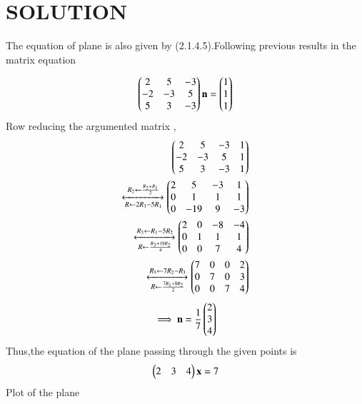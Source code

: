\documentclass[journal,12pt,twocolumn]{IEEEtran}
\begin{document}
\section{SOLUTION} 
The equation of plane is also given by (2.1.4.5).Following previous results in the matrix equation
\begin{enumerate}
\begin{align}
\begin{pmatrix}2 & 5 & -3\\-2 & -3 & 5\\5 & 3 & -3\end{pmatrix} \mathbf{n} = \begin{pmatrix}1\\1\\1\end{pmatrix}
\end{align}
Row reducing the argumented matrix ,
\begin{align}
\begin{pmatrix}2 & 5 & -3 & 1\\-2 & -3 & 5 & 1\\5 & 3 & -3 & 1\end{pmatrix}\\ 
\xleftrightarrow[R\leftarrow 2R_3-5R_1]{R_2\leftarrow \frac{R_2+R_1}{2}}\begin{pmatrix}2 & 5 & -3 & 1\\0 & 1 & 1 & 1\\0 & -19 & 9 & -3\end{pmatrix}
\\
\xleftrightarrow[R\leftarrow \frac{R_3+19R_2}{4}]{R_3\leftarrow R_1-5R_2}\begin{pmatrix}2 & 0 & -8 & -4\\0 & 1 & 1 & 1\\0 & 0 & 7 & 4\end{pmatrix}
\\
\xleftrightarrow[R\leftarrow \frac{7R_1+8R_2}{2}]{R_3\leftarrow 7R_2-R_3}\begin{pmatrix}7& 0& 0 & 2\\0 & 7 & 0 & 3\\0 & 0  & 7 & 4\end{pmatrix}
\end{align}
\begin{align}
\implies \mathbf{n} = \frac{1}{7}\begin{pmatrix}2\\3\\4\end{pmatrix}
\end{align}
Thus,the equation of the plane passing through the given points is 
\begin{align}
\begin{pmatrix}2 & 3 & 4\end{pmatrix}\mathbf{x} = 7  
\end{align}
Plot of the plane 

\end{enumerate}
\end{document}
